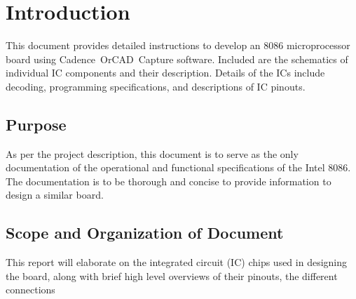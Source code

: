 \newpage
\section{Introduction}
This document provides detailed instructions to develop an 8086 microprocessor board using Cadence\textregistered \ OrCAD\textregistered \ Capture software. Included are the schematics of individual IC components and their description. Details of the ICs include decoding, programming specifications, and descriptions of IC pinouts.

    \subsection{Purpose}
    As per the project description, this document is to serve as the only documentation of the operational and functional specifications of the Intel 8086. The documentation is to be thorough and concise to provide information to design a similar board.

    \subsection{Scope and Organization of Document}
    This report will elaborate on the integrated circuit (IC) chips used in designing the board, along with brief high level overviews of their pinouts, the different connections 
